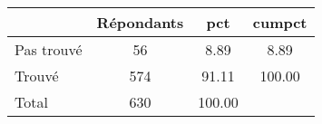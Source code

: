 {
\def\sym#1{\ifmmode^{#1}\else\(^{#1}\)\fi}
\begin{tabular}{l*{1}{ccc}}
\hline\hline
            & Répondants&         pct&      cumpct\\
\hline
Pas trouvé &          56&        8.89&        8.89\\
Trouvé     &         574&       91.11&      100.00\\
Total       &         630&      100.00&            \\
\hline\hline
\end{tabular}
}
